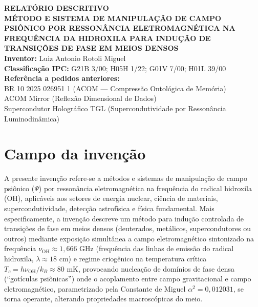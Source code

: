 \documentclass[12pt,a4paper]{article}
\newcommand{\alphaii}{\alpha^2}
\newcommand{\nuOH}{\nu_{\text{OH}}}
\newcommand{\Tcrit}{T_c}
\begin{document}
\begin{center}
{\Large\bfseries RELATÓRIO DESCRITIVO}\\[0.8cm]
{\large\bfseries MÉTODO E SISTEMA DE MANIPULAÇÃO DE CAMPO\\
PSIÔNICO POR RESSONÂNCIA ELETROMAGNÉTICA NA\\
FREQUÊNCIA DA HIDROXILA PARA INDUÇÃO DE\\
TRANSIÇÕES DE FASE EM MEIOS DENSOS}\\[0.8cm]
\textbf{Inventor:} Luiz Antonio Rotoli Miguel\\[0.3cm]
\textbf{Classificação IPC:} G21B 3/00; H05H 1/22;
  G01V 7/00; H01L 39/00\\[0.3cm]
\textbf{Referência a pedidos anteriores:}\\
BR 10 2025 026951 1 (ACOM --- Compressão Ontológica de Memória)\\
ACOM Mirror (Reflexão Dimensional de Dados)\\
Supercondutor Holográfico TGL (Supercondutividade por
  Ressonância Luminodinâmica)
\end{center}

\vspace{1cm}

\section{Campo da invenção}

A presente invenção refere-se a métodos e sistemas de manipulação
de campo psiônico ($\Psi$) por ressonância eletromagnética na
frequência do radical hidroxila (OH), aplicáveis aos setores de
energia nuclear, ciência de materiais, supercondutividade,
detecção astrofísica e física fundamental. Mais especificamente,
a invenção descreve um método para indução controlada de
transições de fase em meios densos (deuterados, metálicos,
supercondutores ou outros) mediante exposição simultânea a campo
eletromagnético sintonizado na frequência $\nuOH \approx 1{,}666$
GHz (frequência das linhas de emissão do radical hidroxila,
$\lambda \approx 18$ cm) e regime criogênico na temperatura
crítica $\Tcrit = h\nuOH / k_B \approx 80$ mK, provocando
nucleação de domínios de fase densa (``gotículas psiônicas'')
onde o acoplamento entre campo gravitacional e campo
eletromagnético, parametrizado pela Constante de Miguel
$\alphaii = 0{,}012031$, se torna operante, alterando
propriedades macroscópicas do meio.
\end{document}
